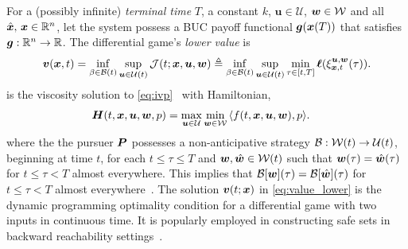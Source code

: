 For a (possibly infinite) \textit{terminal time} $T$, a constant $k$,  $\bm{u}\in \mathcal{U}$, $\bm{w} \in \mathcal{W}$ and all $\hat{\bm{x}}, \, \bm{x} \in \mathbb{R}^n$, let the system possess a  BUC payoff functional $\bm{g}(\bm{x}(T))$ %
%
that satisfies $\bm{g}: \mathbb{R}^n \rightarrow \mathbb{R}$. The differential game's \textit{lower value} is~\citet{Souganidis} 
%
	\begin{align}
	\label{eq:value_lower}
	\valuefunc(\state, t) =  \inf_{\beta \in \mathcal{B}(t)} \sup_{\bm{u} \in \mathcal{U}(t)} \mc{J}(t; \state, \control, \bm{w})   %
	\triangleq  \inf_{\beta \in \mathcal{B}(t)} \sup_{\bm{u} \in \mathcal{U}(t)} \min_{\tau \in [t, T]} \sdf(\traj_{\state,t}^{\control, \bm{w}}(\tau)).  %
	\end{align}
%
 is the viscosity solution to \eqref{eq:ivp}~\citet[Lemma 2.1]{Souganidis} 	with Hamiltonian, 
%
\begin{align}
	&\bm{H} (t, \bm{x}, \bm{u}, \bm{w}, p) = \max_{\bm{u} \in \mathcal{U}} \min_{\bm{w} \in \mathcal{W}} \, \langle f(t, \bm{x}, \bm{u}, \bm{w}), p  \rangle.
	\label{eq:lower_visc_ham}
\end{align}
%
where the the pursuer $\bm{P}$ possesses a non-anticipative strategy $\mathcal{B}: \mathcal{W}(t) \rightarrow \mathcal{U}(t)$, beginning at time $t$, for each $t \le \tau \le T$ and $\bm{w}, \hat{\bm{w}} \in \mathcal{W}(t)$ such that $\bm{w}(\tau) = \hat{\bm{w}}(\tau)$ for $t \le \tau < T$ almost everywhere. This implies that $\mathcal{B}[\bm{w}](\tau) = \mathcal{B}[\hat{\bm{w}}](\tau)$ for $t \le \tau < T$ almost everywhere~\citet{Souganidis}. The solution $\bm{v}(t; \bm{x})$ in \eqref{eq:value_lower} is the dynamic programming optimality condition for a differential game with two inputs in continuous time. It is popularly employed in constructing safe sets in backward reachability settings~\citet{Mitchell2005}.  %



